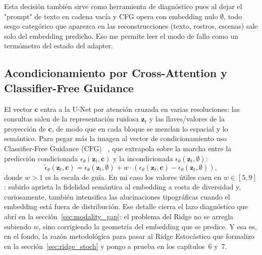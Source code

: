 Esta decisión también sirve como herramienta de diagnóstico pues al dejar el "prompt" de texto 
en cadena vacía y CFG opera con embedding nulo $\emptyset$, todo sesgo categórico que 
aparezca en las reconstrucciones (texto, rostros, escenas) sale solo del embedding predicho. 
Eso me permite leer el modo de fallo como un termómetro del estado del adapter.

\subsection{Acondicionamiento por Cross-Attention y Classifier-Free Guidance}

El vector $\mathbf{c}$ entra a la U-Net por atención cruzada en varias resoluciones: las 
consultas salen de la representación ruidosa $\mathbf{z}_t$ y las llaves/valores de la 
proyección de $\mathbf{c}$, de modo que en cada bloque se mezclan lo espacial y lo semántico. 
Para pegar más la imagen al vector de condicionamiento uso Classifier-Free Guidance (CFG)
~\cite{ho2022cfg,ho2022classifier}, que extrapola sobre la marcha entre la predicción 
condicionada $\epsilon_\theta(\mathbf{z}_t,\mathbf{c})$ y la incondicionada 
$\epsilon_\theta(\mathbf{z}_t,\emptyset)$:
\begin{equation}
\tilde{\epsilon}_\theta(\mathbf{z}_t,\mathbf{c}) = \epsilon_\theta(\mathbf{z}_t,\emptyset) + w\!\cdot\!\left(\epsilon_\theta(\mathbf{z}_t,\mathbf{c}) - \epsilon_\theta(\mathbf{z}_t,\emptyset)\right),
\end{equation}
donde $w>1$ es la escala de guía. En mi caso los valores útiles caen en $w\in[5,9]$: subirlo 
aprieta la fidelidad semántica al embedding a costa de diversidad y, curiosamente, también 
intensifica las alucinaciones tipográficas cuando el embedding está fuera de distribución. 
Ese detalle cierra el lazo diagnóstico que abrí en la sección~\ref{sec:modality_gap}: el 
problema del Ridge no se arregla subiendo $w$, sino corrigiendo la geometría del embedding que 
se predice. Y esa es, en el fondo, la razón metodológica para pasar al Ridge Estocástico que 
formalizo en la sección~\ref{sec:ridge_stoch} y pongo a prueba en los capítulos~6 y~7.

\afterpage{\blankpage}
